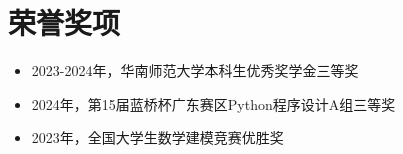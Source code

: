 \section{荣誉奖项}
\begin{normalsize}
  \begin{itemize}[parsep=0.5ex]
    \item 2023-2024年，华南师范大学本科生优秀奖学金三等奖
    \item 2024年，第15届蓝桥杯广东赛区Python程序设计A组三等奖
    \item 2023年，全国大学生数学建模竞赛优胜奖
  \end{itemize}
\end{normalsize}